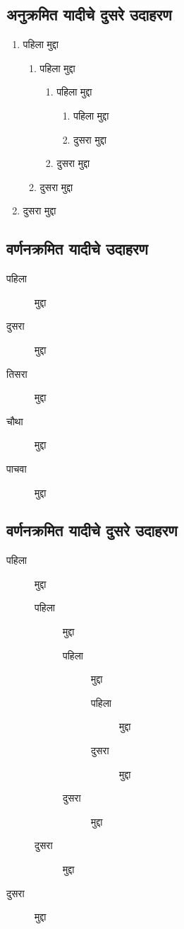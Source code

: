 \subsection*{अनुक्रमित यादीचे दुसरे उदाहरण}
\begin{enumerate}
\item पहिला मुद्दा
\begin{enumerate}
\item पहिला मुद्दा
\begin{enumerate}
\item पहिला मुद्दा
\begin{enumerate}
\item पहिला मुद्दा
\item दुसरा मुद्दा
\end{enumerate}
\item दुसरा मुद्दा
\end{enumerate}
\item दुसरा मुद्दा
\end{enumerate}
\item दुसरा मुद्दा
\end{enumerate}
\subsection{वर्णनक्रमित यादीचे उदाहरण}
\begin{description}
\item[पहिला] मुद्दा
\item[दुसरा] मुद्दा
\item[तिसरा] मुद्दा
\item[चौथा] मुद्दा
\item[पाचवा] मुद्दा
\end{description}
\subsection*{वर्णनक्रमित यादीचे दुसरे उदाहरण}
\begin{description}
\item[पहिला] मुद्दा
\begin{description}
\item[पहिला] मुद्दा
\begin{description}
\item[पहिला] मुद्दा
\begin{description}
\item[पहिला] मुद्दा
\item[दुसरा] मुद्दा
\end{description}
\item[दुसरा] मुद्दा
\end{description}
\item[दुसरा] मुद्दा
\end{description}
\item[दुसरा] मुद्दा
\end{description}